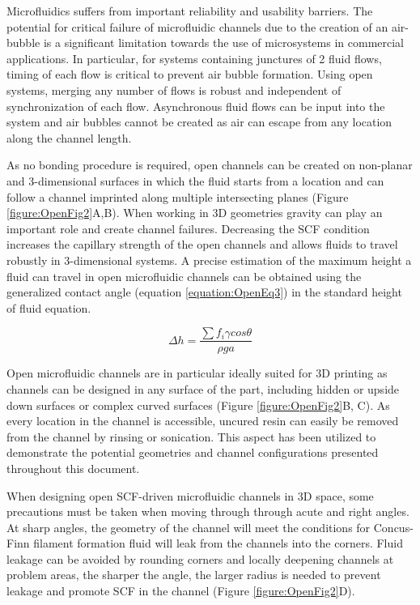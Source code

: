 Microfluidics suffers from important reliability and usability barriers. The potential for critical failure of microfluidic channels due to the creation of an air-bubble is a significant limitation towards the use of microsystems in commercial applications. In particular, for systems containing junctures of 2 fluid flows, timing of each flow is critical to prevent air bubble formation. Using open systems, merging any number of flows is robust and independent of synchronization of each flow. Asynchronous fluid flows can be input into the system and air bubbles cannot be created as air can escape from any location along the channel length. 

As no bonding procedure is required, open channels can be created on non-planar and 3-dimensional surfaces in which the fluid starts from a location and can follow a channel imprinted along multiple intersecting planes (Figure \ref{figure:OpenFig2}A,B). When working in 3D geometries gravity can play an important role and create channel failures. Decreasing the SCF condition increases the capillary strength of the open channels and allows fluids to travel robustly in 3-dimensional systems. A precise estimation of the maximum height a fluid can travel in open microfluidic channels can be obtained using the generalized contact angle (equation \ref{equation:OpenEq3}) in the standard height of fluid equation.

\begin{equation}
    \Delta h = \frac{\sum f_{i}\gamma cos \theta}{\rho g a }
    \label{equation:OpenEq3}
\end{equation}


Open microfluidic channels are in particular ideally suited for 3D printing as channels can be designed in any surface of the part, including hidden or upside down surfaces or complex curved surfaces (Figure \ref{figure:OpenFig2}B, C). As every location in the channel is accessible, uncured resin can easily be removed from the channel by rinsing or sonication. This aspect has been utilized to demonstrate the potential geometries and channel configurations presented throughout this document.

When designing open SCF-driven microfluidic channels in 3D space, some precautions must be taken when moving through through acute and right angles. At sharp angles, the geometry of the channel will meet the conditions for Concus-Finn filament formation fluid will leak from the channels into the corners. Fluid leakage can be avoided by rounding corners and locally deepening channels at problem areas, the sharper the angle, the larger radius is needed to prevent leakage and promote SCF in the channel (Figure \ref{figure:OpenFig2}D). 



